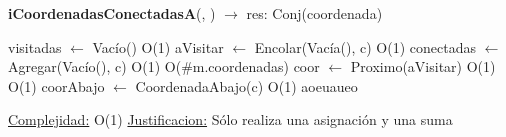 \begin{Algoritmos}
\begin{algorithm}[H]{\textbf{iCoordenadasConectadasA}(, ) $\to$ res: Conj(coordenada)}
	\begin{algorithmic}[1]
		\State visitadas $\gets$ Vac\'io() \Comment O(1)
		\State aVisitar $\gets$ Encolar(Vac\'ia(), c) \Comment  O(1)
		\State conectadas $\gets$ Agregar(Vac\'io(), c) \Comment O(1)
		 \Comment O($\#$m.coordenadas)
			\State coor $\gets$ Proximo(aVisitar) \Comment O(1)
			\State {} \Comment O(1)
					\State coorAbajo $\gets$ CoordenadaAbajo(c) \Comment O(1)
			\Else
				\State aoeuaueo
			\EndIf
		\EndWhile

		\medskip
		\Statex \underline{Complejidad:} O(1)
			\Statex \underline{Justificacion:} Sólo realiza una asignación y una suma
	\end{algorithmic}
\end{algorithm}


\end{Algoritmos}
